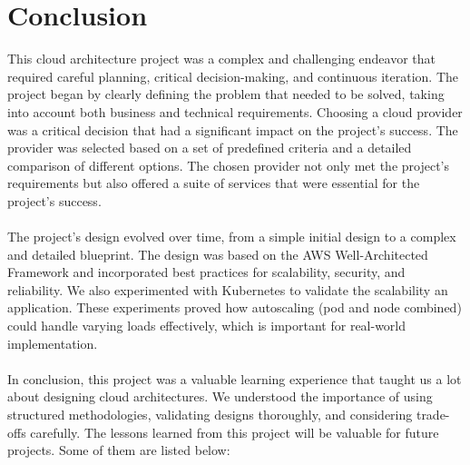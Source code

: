 \documentclass{article}
\begin{document}
\section{Conclusion}
This cloud architecture project was a complex and challenging endeavor that required careful planning, critical decision-making, and continuous iteration. The project began by clearly defining the problem that needed to be solved, taking into account both business and technical requirements. Choosing a cloud provider was a critical decision that had a significant impact on the project's success. The provider was selected based on a set of predefined criteria and a detailed comparison of different options. The chosen provider not only met the project's requirements but also offered a suite of services that were essential for the project's success. \\\\ 
The project's design evolved over time, from a simple initial design to a complex and detailed blueprint. The design was based on the AWS Well-Architected Framework and incorporated best practices for scalability, security, and reliability. We also experimented with Kubernetes to validate the scalability an application. These experiments proved how autoscaling (pod and node combined) could handle varying loads effectively, which is important for real-world implementation.\\\\
In conclusion, this project was a valuable learning experience that taught us a lot about designing cloud architectures. We understood the importance of using structured methodologies, validating designs thoroughly, and considering trade-offs carefully. The lessons learned from this project will be valuable for future projects. Some of them are listed below:
\end{document}
